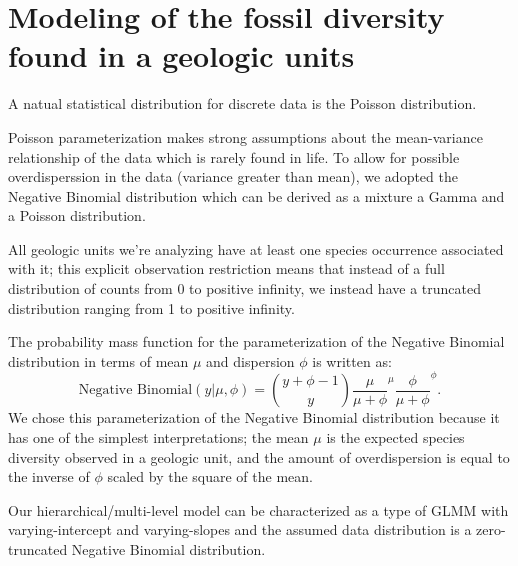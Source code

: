 \documentclass[12pt,letterpaper]{article}
\begin{document}
\section{Modeling of the fossil diversity found in a geologic units}

A natual statistical distribution for discrete data is the Poisson distribution. 

Poisson parameterization makes strong assumptions about the mean-variance relationship of the data which is rarely found in life. To allow for possible overdisperssion in the data (variance greater than mean), we adopted the Negative Binomial distribution which can be derived as a mixture a Gamma and a Poisson distribution.

All geologic units we're analyzing have at least one species occurrence associated with it; this explicit observation restriction means that instead of a full distribution of counts from 0 to positive infinity, we instead have a truncated distribution ranging from 1 to positive infinity.


The probability mass function for the parameterization of the Negative Binomial distribution in terms of mean \(\mu\) and dispersion \(\phi\) is written as:
\begin{equation}
  \text{Negative Binomial}(y | \mu, \phi) = \binom{y + \phi - 1}{y} \frac{\mu}{\mu + \phi}^{\mu} \frac{\phi}{\mu + \phi}^{\phi}.
\end{equation}
We chose this parameterization of the Negative Binomial distribution because it has one of the simplest interpretations; the mean \(\mu\) is the expected species diversity observed in a geologic unit, and the amount of overdispersion is equal to the inverse of \(\phi\) scaled by the square of the mean. 

Our hierarchical/multi-level model can be characterized as a type of GLMM with varying-intercept and varying-slopes and the assumed data distribution is a zero-truncated Negative Binomial distribution.
\end{document}
